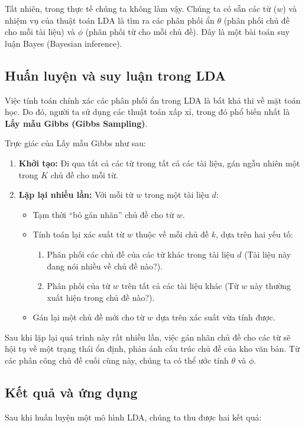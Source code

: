 Tất nhiên, trong thực tế chúng ta không làm vậy. Chúng ta có sẵn các từ ($w$) và nhiệm vụ của thuật toán LDA là tìm ra các phân phối ẩn $\theta$ (phân phối chủ đề cho mỗi tài liệu) và $\phi$ (phân phối từ cho mỗi chủ đề). Đây là một bài toán suy luận Bayes (Bayesian inference).

\subsection{Huấn luyện và suy luận trong LDA}
Việc tính toán chính xác các phân phối ẩn trong LDA là bất khả thi về mặt toán học. Do đó, người ta sử dụng các thuật toán xấp xỉ, trong đó phổ biến nhất là \textbf{Lấy mẫu Gibbs (Gibbs Sampling)}.

Trực giác của Lấy mẫu Gibbs như sau:
\begin{enumerate}
    \item \textbf{Khởi tạo:} Đi qua tất cả các từ trong tất cả các tài liệu, gán ngẫu nhiên một trong $K$ chủ đề cho mỗi từ.
    \item \textbf{Lặp lại nhiều lần:} Với mỗi từ $w$ trong một tài liệu $d$:
        \begin{itemize}
            \item Tạm thời “bỏ gán nhãn” chủ đề cho từ $w$.
            \item Tính toán lại xác suất từ $w$ thuộc về mỗi chủ đề $k$, dựa trên hai yếu tố:
                \begin{enumerate}
                    \item Phân phối các chủ đề của các từ khác trong tài liệu $d$ (Tài liệu này đang nói nhiều về chủ đề nào?).
                    \item Phân phối của từ $w$ trên tất cả các tài liệu khác (Từ $w$ này thường xuất hiện trong chủ đề nào?).
                \end{enumerate}
            \item Gán lại một chủ đề mới cho từ $w$ dựa trên xác suất vừa tính được.
        \end{itemize}
\end{enumerate}
Sau khi lặp lại quá trình này rất nhiều lần, việc gán nhãn chủ đề cho các từ sẽ hội tụ về một trạng thái ổn định, phản ánh cấu trúc chủ đề của kho văn bản. Từ các phân công chủ đề cuối cùng này, chúng ta có thể ước tính $\theta$ và $\phi$.

\subsection{Kết quả và ứng dụng}
Sau khi huấn luyện một mô hình LDA, chúng ta thu được hai kết quả:

